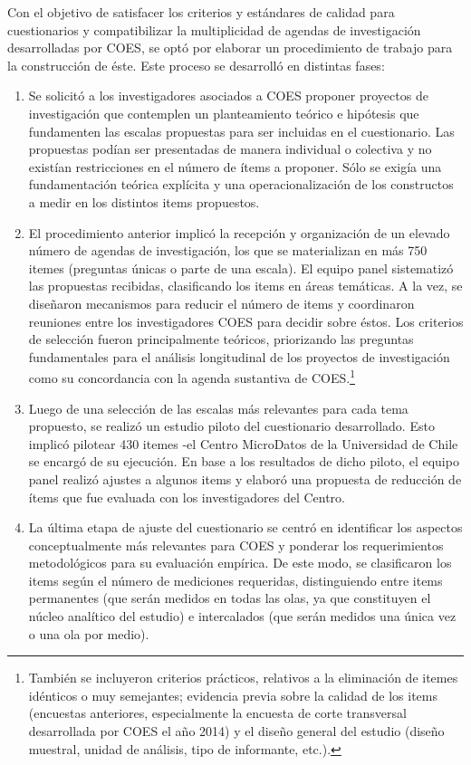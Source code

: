 \documentclass[
]{book}
\begin{document}
Con el objetivo de satisfacer los criterios y estándares de calidad para cuestionarios y compatibilizar la multiplicidad de agendas de investigación desarrolladas por COES, se optó por elaborar un procedimiento de trabajo para la construcción de éste. Este proceso se desarrolló en distintas fases:

\begin{enumerate}
\def\labelenumi{\arabic{enumi}.}
\item
  Se solicitó a los investigadores asociados a COES proponer proyectos de investigación que contemplen un planteamiento teórico e hipótesis que fundamenten las escalas propuestas para ser incluidas en el cuestionario. Las propuestas podían ser presentadas de manera individual o colectiva y no existían restricciones en el número de ítems a proponer. Sólo se exigía una fundamentación teórica explícita y una operacionalización de los constructos a medir en los distintos items propuestos.
\item
  El procedimiento anterior implicó la recepción y organización de un elevado número de agendas de investigación, los que se materializan en más 750 itemes (preguntas únicas o parte de una escala). El equipo panel sistematizó las propuestas recibidas, clasificando los items en áreas temáticas. A la vez, se diseñaron mecanismos para reducir el número de items y coordinaron reuniones entre los investigadores COES para decidir sobre éstos. Los criterios de selección fueron principalmente teóricos, priorizando las preguntas fundamentales para el análisis longitudinal de los proyectos de investigación como su concordancia con la agenda sustantiva de COES.\footnote{También se incluyeron criterios prácticos, relativos a la eliminación de itemes idénticos o muy semejantes; evidencia previa sobre la calidad de los items (encuestas anteriores, especialmente la encuesta de corte transversal desarrollada por COES el año 2014) y el diseño general del estudio (diseño muestral, unidad de análisis, tipo de informante, etc.).}
\item
  Luego de una selección de las escalas más relevantes para cada tema propuesto, se realizó un estudio piloto del cuestionario desarrollado. Esto implicó pilotear 430 itemes -el Centro MicroDatos de la Universidad de Chile se encargó de su ejecución. En base a los resultados de dicho piloto, el equipo panel realizó ajustes a algunos items y elaboró una propuesta de reducción de ítems que fue evaluada con los investigadores del Centro.
\item
  La última etapa de ajuste del cuestionario se centró en identificar los aspectos conceptualmente más relevantes para COES y ponderar los requerimientos metodológicos para su evaluación empírica. De este modo, se clasificaron los items según el número de mediciones requeridas, distinguiendo entre items permanentes (que serán medidos en todas las olas, ya que constituyen el núcleo analítico del estudio) e intercalados (que serán medidos una única vez o una ola por medio).
\end{enumerate}
\end{document}
